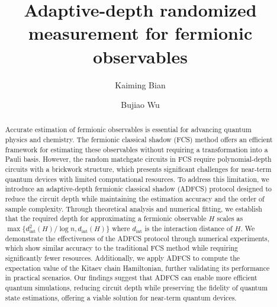 \documentclass[showpacs,onecolumn,aps,prx,long bibliography,superscriptaddress,notitlepage]{revtex4-1}
\newcommand{\cbra}[1]{\{ #1 \}}
\begin{document}
\title{Adaptive-depth randomized measurement for fermionic observables}
\author{Kaiming Bian}
\author{Bujiao Wu}

\begin{abstract}
Accurate estimation of fermionic observables is essential for advancing quantum physics and chemistry. The fermionic classical shadow (FCS) method offers an efficient framework for estimating these observables without requiring a transformation into a Pauli basis. However, the random matchgate circuits in FCS require polynomial-depth circuits with a brickwork structure, which presents significant challenges for near-term quantum devices with limited computational resources.
To address this limitation, we introduce an adaptive-depth fermionic classical shadow (ADFCS) protocol designed to reduce the circuit depth while maintaining the estimation accuracy and the order of sample complexity. 
Through theoretical analysis and numerical fitting, we establish that the required depth for approximating a fermionic observable $H$ scales as $\max\cbra{d^2_{\text{int}}(H)/\log n, d_{\text{int}}(H)}$ where $d_{\text{int}}$ is the interaction distance of $H$.
We demonstrate the effectiveness of the ADFCS protocol through numerical experiments, which show similar accuracy to the traditional FCS method while requiring significantly fewer resources. Additionally, we apply ADFCS to compute the expectation value of the Kitaev chain Hamiltonian, further validating its performance in practical scenarios. 
Our findings suggest that ADFCS can enable more efficient quantum simulations, reducing circuit depth while preserving the fidelity of quantum state estimations, offering a viable solution for near-term quantum devices.
\end{abstract}
\maketitle
\end{document}
